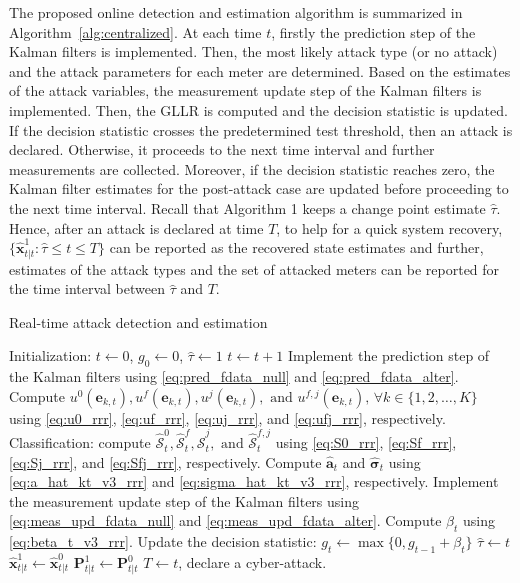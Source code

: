 \documentclass[onecolumn]{IEEEtran}
\begin{document}
The proposed online detection and estimation algorithm is summarized in Algorithm~\ref{alg:centralized}. At each time $t$, firstly the prediction step of the Kalman filters is implemented. Then, the most likely attack type (or no attack) and the attack parameters for each meter are determined. Based on the estimates of the attack variables, the measurement update step of the Kalman filters is implemented. Then, the GLLR is computed and the decision statistic is updated. If the decision statistic crosses the predetermined test threshold, then an attack is declared. Otherwise, it proceeds to the next time interval and further measurements are collected. Moreover, if the decision statistic reaches zero, the Kalman filter estimates for the post-attack case are updated before proceeding to the next time interval. Recall that Algorithm 1 keeps a change point estimate $\hat{\tau}$. Hence, after an attack is declared at time $T$, to help for a quick system recovery, $\{\hat{\mathbf{x}}_{t|t}^1: \hat{\tau} \leq t \leq T\}$ can be reported as the recovered state estimates and further, estimates of the attack types and the set of attacked meters can be reported for the time interval between $\hat{\tau}$ and $T$.

\begin{algorithm}[t]\small
\caption{\small Real-time attack detection and estimation}
\label{alg:centralized}
\baselineskip=0.4cm
\begin{algorithmic}[1]
\STATE Initialization: $t \gets 0$, $g_{0} \gets 0$, $\hat{\tau} \gets 1$
    \STATE $t \gets t+1$
    \STATE Implement the prediction step of the Kalman filters using \eqref{eq:pred_fdata_null} and \eqref{eq:pred_fdata_alter}.
    \STATE Compute $u^0(\mathbf{e}_{k,t}), u^f(\mathbf{e}_{k,t}), u^j(\mathbf{e}_{k,t}), \mbox{ and } u^{f,j}(\mathbf{e}_{k,t}), \, \forall k \in \{1, 2, \dots, K\}$ using \eqref{eq:u0_rrr}, \eqref{eq:uf_rrr}, \eqref{eq:uj_rrr}, and \eqref{eq:ufj_rrr}, respectively.
    \STATE Classification: compute $\hat{\mathcal{S}}_t^0, \hat{\mathcal{S}}_t^f, \hat{\mathcal{S}}_t^j, \mbox{ and } \hat{\mathcal{S}}_t^{f,j}$ using \eqref{eq:S0_rrr}, \eqref{eq:Sf_rrr}, \eqref{eq:Sj_rrr}, and \eqref{eq:Sfj_rrr}, respectively.
    \STATE Compute $\hat{\mathbf{a}}_t$ and $\hat{\pmb{\sigma}}_t$ using \eqref{eq:a_hat_kt_v3_rrr} and \eqref{eq:sigma_hat_kt_v3_rrr}, respectively.
    \STATE Implement the measurement update step of the Kalman filters using \eqref{eq:meas_upd_fdata_null} and \eqref{eq:meas_upd_fdata_alter}.
    \STATE Compute $\beta_t$ using \eqref{eq:beta_t_v3_rrr}.
    \STATE Update the decision statistic: $g_t \gets \max\{0, g_{t-1} + \beta_t\}$
        \STATE $\hat{\tau} \gets t$
        \STATE $\hat{\mathbf{x}}_{t|t}^1 \gets \hat{\mathbf{x}}_{t|t}^0$
        \STATE $\mathbf{P}_{t|t}^1 \gets \mathbf{P}_{t|t}^0$
	\ENDIF
\ENDWHILE
\STATE $T \gets t$, declare a cyber-attack.
\end{algorithmic}
\end{algorithm}
\end{document}
